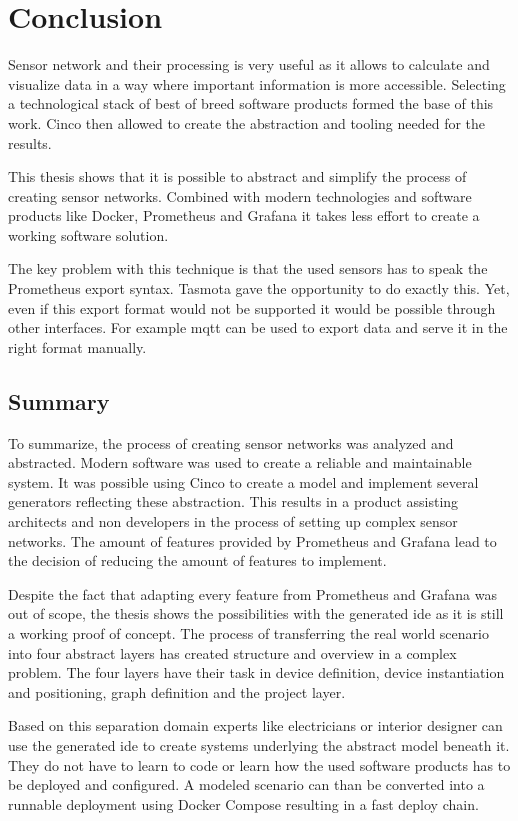 \chapter{Conclusion}
\label{chapter:conclusion}
Sensor network and their processing is very useful as it allows to calculate and visualize data in a way where important information is more accessible. Selecting a technological stack of best of breed software products formed the base of this work. Cinco then allowed to create the abstraction and tooling needed for the results.

This thesis shows that it is possible to abstract and simplify the process of creating sensor networks. Combined with modern technologies and software products like Docker, Prometheus and Grafana it takes less effort to create a working software solution. 

The key problem with this technique is that the used sensors has to speak the Prome\-theus export syntax. Tasmota gave the opportunity to do exactly this. Yet, even if this export format would not be supported it would be possible through other interfaces. For example \gls{mqtt} can be used to export data and serve it in the right format manually. 

\section{Summary}
To summarize, the process of creating sensor networks was analyzed and abstracted. Modern software was used to create a reliable and maintainable system. It was possible using Cinco to create a model and implement several generators reflecting these abstraction. This results in a product assisting architects and non developers in the process of setting up complex sensor networks. The amount of features provided by Prometheus and Grafana lead to the decision of reducing the amount of features to implement. 

Despite the fact that adapting every feature from Prometheus and Grafana was out of scope, the thesis shows the possibilities with the generated \gls{ide} as it is still a working proof of concept. The process of transferring the real world scenario into four abstract layers has created structure and overview in a complex problem. The four layers have their task in device definition, device instantiation and positioning, graph definition and the project layer. 

Based on this separation domain experts like electricians or interior designer can use the generated \gls{ide} to create systems underlying the abstract model beneath it. They do not have to learn to code or learn how the used software products has to be deployed and configured. A modeled scenario can than be converted into a runnable deployment using Docker Compose resulting in a fast deploy chain.

